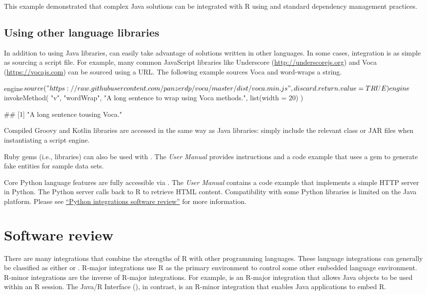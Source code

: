 This example demonstrated that complex Java solutions can be integrated with R using  and standard dependency management practices.

\subsection{Using other language libraries} %

In addition to using Java libraries,  can easily take advantage of solutions written in other languages. In some cases, integration is as simple as sourcing a script file. For example, many common JavaScript libraries like Underscore (\url{http://underscorejs.org}) and Voca (\url{https://vocajs.com}) can be sourced using a URL. The following example sources Voca and word-wraps a string.

\begin{example}
engine$source(
  "https://raw.githubusercontent.com/panzerdp/voca/master/dist/voca.min.js",
  discard.return.value = TRUE
)
engine$invokeMethod(
  "v",
  "wordWrap",
  "A long sentence to wrap using Voca methods.",
  list(width = 20)
)

## [1] "A long sentence to\nwrap using Voca\nmethods."
\end{example}

Compiled Groovy and Kotlin libraries are accessed in the same way as Java libraries: simply include the relevant class or JAR files when instantiating a script engine.

Ruby gems (i.e., libraries) can also be used with . The \textit{ User Manual} provides instructions and a code example that uses a gem to generate fake entities for sample data sets.

Core Python language features are fully accessible via . The \textit{ User Manual} contains a code example that implements a simple HTTP server in Python. The Python server calls back to R to retrieve HTML content. Compatibility with some Python libraries is limited on the Java platform. Please see \hyperlink{python-integrations}{``Python integrations software review''} for more information.

\hypertarget{software-review}{}
\section{Software review}

There are many integrations that combine the strengths of R with other programming languages. These language integrations can generally be classified as either  or . R-major integrations use R as the primary environment to control some other embedded language environment. R-minor integrations are the inverse of R-major integrations. For example,  is an R-major integration that allows Java objects to be used within an R session. The Java/R Interface (), in contrast, is an R-minor integration that enables Java applications to embed R.

